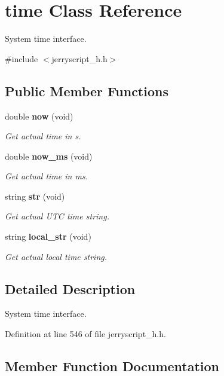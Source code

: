 \section{time Class Reference}
\label{classtime}


System time interface.  




{\ttfamily \#include $<$jerryscript\+\_\+h.\+h$>$}

\subsection*{Public Member Functions}
\begin{DoxyCompactItemize}
\item 
double \textbf{ now} (void)
\begin{DoxyCompactList}\small\item\em Get actual time in s. \end{DoxyCompactList}\item 
double \textbf{ now\+\_\+ms} (void)
\begin{DoxyCompactList}\small\item\em Get actual time in ms. \end{DoxyCompactList}\item 
string \textbf{ str} (void)
\begin{DoxyCompactList}\small\item\em Get actual U\+TC time string. \end{DoxyCompactList}\item 
string \textbf{ local\+\_\+str} (void)
\begin{DoxyCompactList}\small\item\em Get actual local time string. \end{DoxyCompactList}\end{DoxyCompactItemize}


\subsection{Detailed Description}
System time interface. 

Definition at line 546 of file jerryscript\+\_\+h.\+h.



\subsection{Member Function Documentation}
\mbox{\label{classtime_a90260b78bd47ed6283e47ac4a049e347}} 

